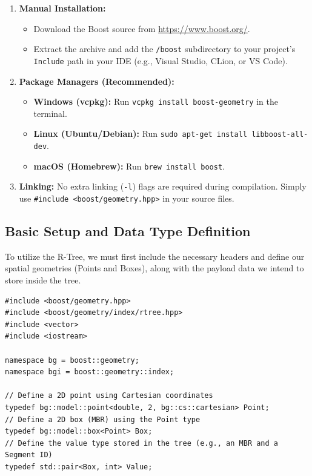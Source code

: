 \documentclass[a4paper, 10pt, titlepage]{report}
\begin{document}
\begin{enumerate}
    \item \textbf{Manual Installation:}
    \begin{itemize}
        \item Download the Boost source from \url{https://www.boost.org/}.
        \item Extract the archive and add the \texttt{/boost} subdirectory to your project's \texttt{Include} path in your IDE (e.g., Visual Studio, CLion, or VS Code).
    \end{itemize}
    \item \textbf{Package Managers (Recommended):}
    \begin{itemize}
        \item \textbf{Windows (vcpkg):} Run \texttt{vcpkg install boost-geometry} in the terminal.
        \item \textbf{Linux (Ubuntu/Debian):} Run \texttt{sudo apt-get install libboost-all-dev}.
        \item \textbf{macOS (Homebrew):} Run \texttt{brew install boost}.
    \end{itemize}
    \item \textbf{Linking:} No extra linking (\texttt{-l}) flags are required during compilation. Simply use \texttt{\#include <boost/geometry.hpp>} in your source files.
\end{enumerate}

\subsection{Basic Setup and Data Type Definition}
To utilize the R-Tree, we must first include the necessary headers and define our spatial geometries (Points and Boxes), along with the payload data we intend to store inside the tree.

\begin{verbatim}
#include <boost/geometry.hpp>
#include <boost/geometry/index/rtree.hpp>
#include <vector>
#include <iostream>

namespace bg = boost::geometry;
namespace bgi = boost::geometry::index;

// Define a 2D point using Cartesian coordinates
typedef bg::model::point<double, 2, bg::cs::cartesian> Point;
// Define a 2D box (MBR) using the Point type
typedef bg::model::box<Point> Box;
// Define the value type stored in the tree (e.g., an MBR and a Segment ID)
typedef std::pair<Box, int> Value;
\end{verbatim}
\end{document}
